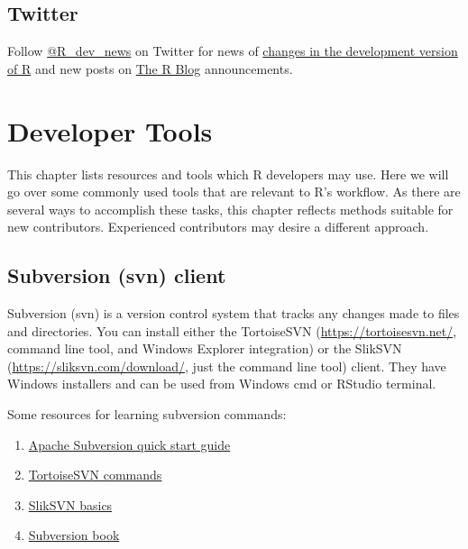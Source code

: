 \documentclass[
]{book}
\begin{document}
\section{Twitter}\label{twitter}

Follow \href{https://twitter.com/R_dev_news}{@R\_dev\_news} on Twitter for news of \href{https://developer.r-project.org/RSSfeeds.html}{changes in the development version of R} and new posts on \href{https://blog.r-project.org/}{The R Blog} announcements.

\chapter{Developer Tools}\label{DevTools}

This chapter lists resources and tools which R developers may use. Here we will go over some commonly used tools that are relevant to R's workflow. As there are several ways to accomplish these tasks, this chapter reflects methods suitable for new contributors. Experienced contributors may desire a different approach.

\section{Subversion (svn) client}\label{subversion-svn-client}

Subversion (svn) is a version control system that tracks any changes made to files and directories. You can install either the TortoiseSVN (\url{https://tortoisesvn.net/}, command line tool, and Windows Explorer integration) or the SlikSVN (\url{https://sliksvn.com/download/}, just the command line tool) client. They have Windows installers and can be used from Windows cmd or RStudio terminal.

Some resources for learning subversion commands:

\begin{enumerate}
\def\labelenumi{\arabic{enumi}.}
\item
  \href{http://subversion.apache.org/quick-start}{Apache Subversion quick start guide}
\item
  \href{https://tortoisesvn.net/docs/nightly/TortoiseSVN_en/tsvn-cli-main.html}{TortoiseSVN commands}
\item
  \href{https://sliksvn.com/support/subversion-basics-using-check-out-update-check-in-commit/}{SlikSVN basics}
\item
  \href{http://svnbook.red-bean.com/}{Subversion book}
\end{enumerate}
\end{document}
